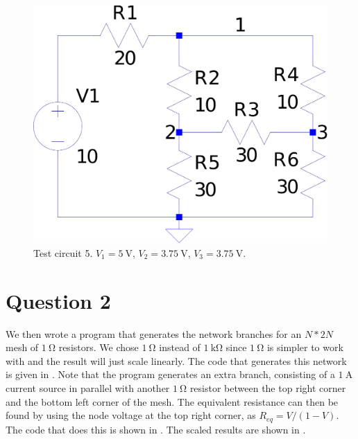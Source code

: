 \documentclass[journal,hidelinks]{IEEEtran}
\begin{document}
\begin{figure}[!htb]
  \centering
  \includegraphics[width=\columnwidth,height=0.6\columnwidth,keepaspectratio]{question-1/circuit-5.pdf}
  \caption{Test circuit 5. $V_1 = \SI{5}{\volt}$, $V_2 = \SI{3.75}{\volt}$, $V_3 = \SI{3.75}{\volt}$.}
  \label{fig:q1-circuit-5}
\end{figure}

\section*{Question 2}

We then wrote a program that generates the network branches for an $N * 2N$ mesh of $\SI{1}{\ohm}$ resistors. We chose $\SI{1}{\ohm}$ instead of $\SI{1}{\kilo\ohm}$ since $\SI{1}{\ohm}$ is simpler to work with and the result will just scale linearly. The code that generates this network is given in . Note that the program generates an extra branch, consisting of a $\SI{1}{\ampere}$ current source in parallel with another $\SI{1}{\ohm}$ resistor between the top right corner and the bottom left corner of the mesh. The equivalent resistance can then be found by using the node voltage at the top right corner, as $R_{eq} = V / (1 - V)$. The code that does this is shown in . The scaled results are shown in .

\begin{table}[!htb]
  \centering
  \caption{$R$ vs. $N$ for the $N * 2N$ mesh of $\SI{1}{\kilo\ohm}$ resistors.}
  \label{tab:q2-resistance}
\end{table}
\end{document}
